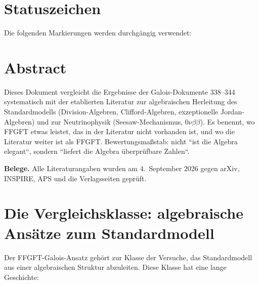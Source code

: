 
\providecommand{\BM}{\textbf{[B]}}
\providecommand{\KM}{\textbf{[K]}}
\providecommand{\SM}{\textbf{[S]}}
\providecommand{\XM}{\textbf{[X]}}

{}



\section*{Statuszeichen}

Die folgenden Markierungen werden durchgängig verwendet:


\section*{Abstract}

Dieses Dokument vergleicht die Ergebnisse der Galois-Dokumente 338--344 systematisch
mit der etablierten Literatur zur algebraischen Herleitung des Standardmodells
(Division-Algebren, Clifford-Algebren, exzeptionelle Jordan-Algebren) und zur
Neutrinophysik (Seesaw-Mechanismus, $0\nu\beta\beta$). Es benennt, wo FFGFT
etwas leistet, das in der Literatur nicht vorhanden ist, und wo die Literatur
weiter ist als FFGFT. Bewertungsmaßstab: nicht ``ist die Algebra elegant``, sondern
``liefert die Algebra überprüfbare Zahlen``.

\textbf{Belege.} Alle Literaturangaben wurden am 4.~September 2026 gegen arXiv,
INSPIRE, APS und die Verlagsseiten geprüft.

\section{Die Vergleichsklasse: algebraische Ansätze zum Standardmodell}

Der FFGFT-Galois-Ansatz gehört zur Klasse der Versuche, das Standardmodell aus
einer algebraischen Struktur abzuleiten. Diese Klasse hat eine lange Geschichte:


